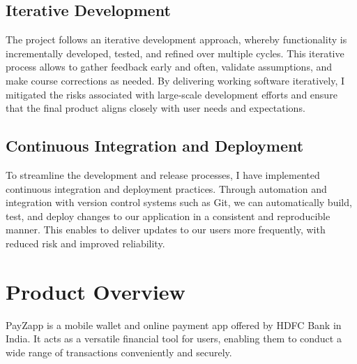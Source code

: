 \documentclass[12pt,a4paper]{report}
\begin{document}
\subsection{Iterative Development}
The project follows an iterative development approach, whereby functionality is incrementally developed, tested, and refined over multiple cycles. This iterative process allows to gather feedback early and often, validate assumptions, and make course corrections as needed. By delivering working software iteratively, I mitigated the risks associated with large-scale development efforts and ensure that the final product aligns closely with user needs and expectations.


\subsection{Continuous Integration and Deployment}
To streamline the development and release processes, I have implemented continuous integration and deployment practices. Through automation and integration with version control systems such as Git, we can automatically build, test, and deploy changes to our application in a consistent and reproducible manner. This enables to deliver updates to our users more frequently, with reduced risk and improved reliability.

 
\section{Product Overview}
PayZapp is a mobile wallet and online payment app offered by HDFC Bank in India. It acts as a versatile financial tool for users, enabling them to conduct a wide range of transactions conveniently and securely.
\end{document}
